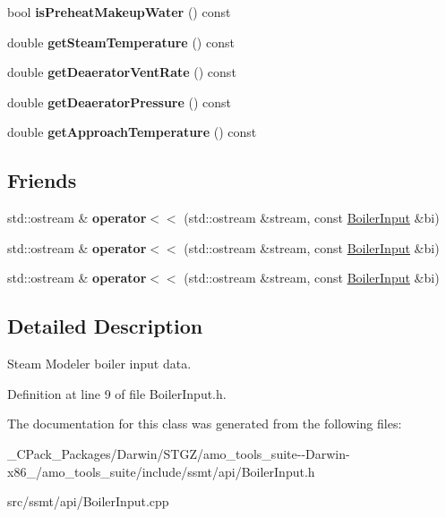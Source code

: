 \begin{DoxyCompactItemize}
bool {\bfseries is\+Preheat\+Makeup\+Water} () const
\item 
\mbox{\label{class_boiler_input_aec0859643e7edf458fe40685d29a67f8}} 
double {\bfseries get\+Steam\+Temperature} () const
\item 
\mbox{\label{class_boiler_input_a95ad03651a9b5caac6c8cd8e19e76a0b}} 
double {\bfseries get\+Deaerator\+Vent\+Rate} () const
\item 
\mbox{\label{class_boiler_input_a74475254323b0d3ebe8636a45437366f}} 
double {\bfseries get\+Deaerator\+Pressure} () const
\item 
\mbox{\label{class_boiler_input_a0c458f1838e99f98f5eaf5c9217b1033}} 
double {\bfseries get\+Approach\+Temperature} () const
\end{DoxyCompactItemize}
\subsection*{Friends}
\begin{DoxyCompactItemize}
\item 
\mbox{\label{class_boiler_input_a69dd9d016fc4b9639262c8a20eb6da99}} 
std\+::ostream \& {\bfseries operator$<$$<$} (std\+::ostream \&stream, const \hyperlink{class_boiler_input}{Boiler\+Input} \&bi)
\item 
\mbox{\label{class_boiler_input_a69dd9d016fc4b9639262c8a20eb6da99}} 
std\+::ostream \& {\bfseries operator$<$$<$} (std\+::ostream \&stream, const \hyperlink{class_boiler_input}{Boiler\+Input} \&bi)
\item 
\mbox{\label{class_boiler_input_a69dd9d016fc4b9639262c8a20eb6da99}} 
std\+::ostream \& {\bfseries operator$<$$<$} (std\+::ostream \&stream, const \hyperlink{class_boiler_input}{Boiler\+Input} \&bi)
\end{DoxyCompactItemize}


\subsection{Detailed Description}
Steam Modeler boiler input data. 

Definition at line 9 of file Boiler\+Input.\+h.



The documentation for this class was generated from the following files\+:\begin{DoxyCompactItemize}
\item 
\+\_\+\+C\+Pack\+\_\+\+Packages/\+Darwin/\+S\+T\+G\+Z/amo\+\_\+tools\+\_\+suite-\/-\/\+Darwin-\/x86\+\_/amo\+\_\+tools\+\_\+suite/include/ssmt/api/Boiler\+Input.\+h\item 
src/ssmt/api/Boiler\+Input.\+cpp\end{DoxyCompactItemize}
